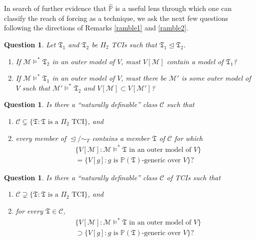 \documentclass[12pt, twoside]{memoir}
\numberwithin{equation}{section}
\newtheorem{ques}[thm]{Question}
\theoremstyle{definition}
\theoremstyle{remark}
\theoremstyle{definition}
\theoremstyle{definition}
\theoremstyle{definition}
\theoremstyle{remark}
\begin{document}
In search of further evidence that $\hat{\mathbb{P}}$ is a useful lens through which one can classify the reach of forcing as a technique, we ask the next few questions following the directions of Remarks \ref{ramble1} and \ref{ramble2}.

\begin{ques}
Let $\mathfrak{T}_1$ and $\mathfrak{T}_2$ be $\Pi_2$ TCIs such that $\mathfrak{T}_1 \trianglelefteq \mathfrak{T}_2$.
\begin{enumerate}[label=(\arabic*)]
    \item If $\mathcal{M} \models^* \mathfrak{T}_2$ in an outer model of $V$, must $V[\mathcal{M}]$ contain a model of $\mathfrak{T}_1$?
    \item If $\mathcal{M} \models^* \mathfrak{T}_1$ in an outer model of $V$, must there be $\mathcal{M}'$ is some outer model of $V$ such that $\mathcal{M}' \models^* \mathfrak{T}_2$ and $V[\mathcal{M}] \subset V[\mathcal{M}']$?
\end{enumerate}
\end{ques}

\begin{ques}
Is there a ``naturally definable'' class $\mathcal{C}$ such that 
\begin{enumerate}[label=(\alph*)]
    \item $\mathcal{C} \subsetneq \{\mathfrak{T} : \mathfrak{T} \text{ is a } \Pi_2 \text{ TCI}\}$, and
    \item every member of $\trianglelefteq / \sim_T$ contains a member $\mathfrak{T}$ of $\mathcal{C}$ for which
    \begin{align*}
        & \{V[\mathcal{M}] : \mathcal{M} \models^* \mathfrak{T} \text{ in an outer model of } V\} \\
        & = \{V[g] : g \text{ is } \mathbb{P}(\mathfrak{T}) \text{-generic over } V\} \text{?}
    \end{align*}
\end{enumerate} 
\end{ques}

\begin{ques}
Is there a ``naturally definable'' class $\mathcal{C}$ of TCIs such that 
\begin{enumerate}[label=(\alph*)]
    \item $\mathcal{C} \supsetneq \{\mathfrak{T} : \mathfrak{T} \text{ is a } \Pi_2 \text{ TCI}\}$, and
    \item for every $\mathfrak{T} \in \mathcal{C}$, 
    \begin{align*}
        & \{V[\mathcal{M}] : \mathcal{M} \models^* \mathfrak{T} \text{ in an outer model of } V\} \\
        & \supset \{V[g] : g \text{ is } \mathbb{P}(\mathfrak{T}) \text{-generic over } V\} \text{?}
    \end{align*}
\end{enumerate} 
\end{ques}
\end{document}

